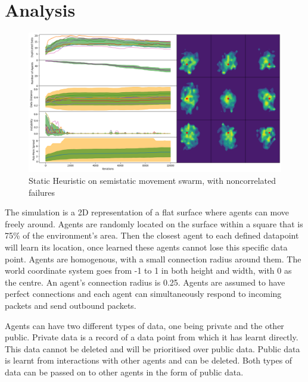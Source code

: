 \documentclass{UoYCSproject}
\begin{document}

\chapter{Analysis}
\label{cha:Analysis}

\begin{figure}[htb]
\label{fig:static_movement_non}
\begin{center}
\centering
\includegraphics[width=\linewidth]{"./Static_Heuristic/Static_Movement_non.png"}
\caption{Static Heuristic on semi\-static movement swarm, with non\-correlated failures}
\end{center}
\end{figure}

The simulation is a 2D representation of a flat surface where agents can move freely around.
Agents are randomly located on the surface within a square that is 75\% of the environment's area.
Then the closest agent to each defined datapoint will learn its location, once learned these agents cannot lose this specific data point.
Agents are homogenous, with a small connection radius around them.
The world coordinate system goes from -1 to 1 in both height and width, with 0 as the centre.
An agent’s connection radius is 0.25.
Agents are assumed to have perfect connections and each agent can simultaneously respond to incoming packets and send outbound packets.

Agents can have two different types of data, one being private and the other public.
Private data is a record of a data point from which it has learnt directly.
This data cannot be deleted and will be prioritised over public data.
Public data is learnt from interactions with other agents and can be deleted.
Both types of data can be passed on to other agents in the form of public data.
\end{document}
